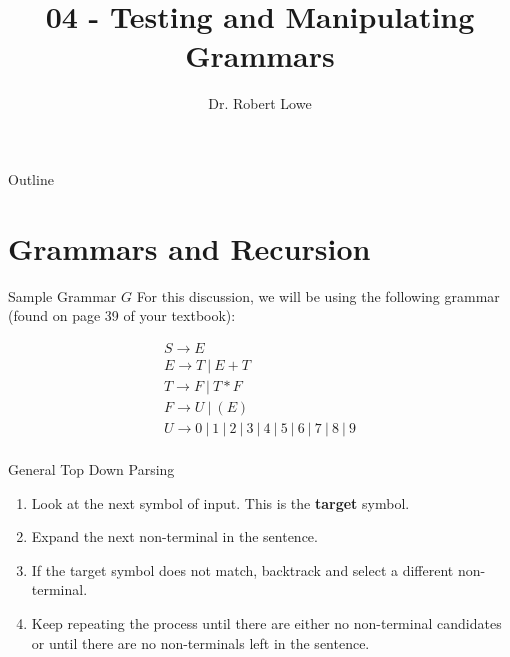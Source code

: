 \documentclass[]{beamer}
\title{04 - Testing and Manipulating Grammars}
\author{Dr. Robert Lowe\\}
\institute[Maryville College] %
{
  Division of Mathematics and Computer Science\\
  Maryville College
}
\date[]{}
\begin{document}
\begin{frame}
  \titlepage
\end{frame}

\begin{frame}{Outline}
  \tableofcontents
\end{frame}





\section{Grammars and Recursion}

\begin{frame}{Sample Grammar $G$}
    For this discussion, we will be using the following grammar (found on page 39 of your textbook):

    \[
      \begin{array}{l}
        S \rightarrow E\\
        E \rightarrow T\ |\ E + T\\
        T \rightarrow F\ |\ T * F\\
        F \rightarrow U\ |\ (E)\\
        U \rightarrow 0\ |\ 1\ |\ 2\ |\ 3\ |\ 4\ |\ 5\ |\ 6\ |\ 7\ |\ 8\ |\ 9\\
      \end{array}
    \]
\end{frame}

\begin{frame}{General Top Down Parsing}
  \begin{enumerate}[<+->]
    \item Look at the next symbol of input.  This is the \textbf{target} symbol.
    \item Expand the next non-terminal in the sentence.
    \item If the target symbol does not match, backtrack and select a different non-terminal.
    \item Keep repeating the process until there are either no non-terminal candidates or until there are no non-terminals left in the sentence.
  \end{enumerate}
\end{frame}
\end{document}
